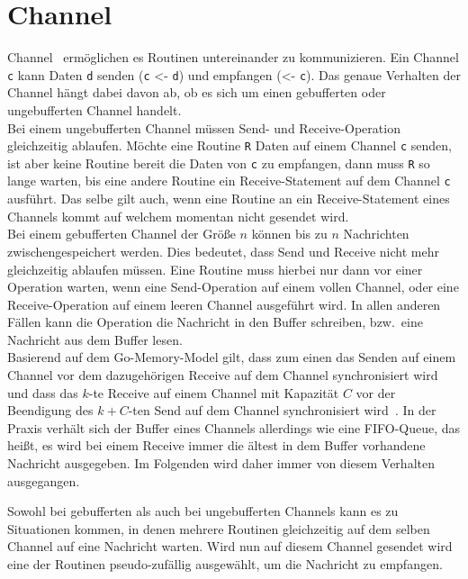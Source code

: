 \section{Channel}\label{Chap:Back-Sec:Chann}
Channel~\cite{effectiveGo} ermöglichen es Routinen untereinander zu 
kommunizieren.
Ein Channel \texttt{c} kann Daten \texttt{d} senden (\texttt{c} <- \texttt{d})
und empfangen (<- \texttt{c}). Das genaue Verhalten der Channel hängt dabei 
davon ab, ob es sich um einen gebufferten oder ungebufferten Channel handelt. \\
Bei einem ungebufferten Channel müssen Send- und Receive-Operation gleichzeitig 
ablaufen. Möchte eine Routine \texttt{R} Daten auf einem Channel \texttt{c} senden, 
ist aber keine Routine bereit die Daten von \texttt{c} zu empfangen, 
dann muss \texttt{R} so lange warten, bis eine andere Routine ein
Receive-Statement auf dem Channel \texttt{c} ausführt. Das selbe gilt auch, wenn 
eine Routine an ein Receive-Statement eines Channels kommt auf welchem 
momentan nicht gesendet wird.\\
Bei einem gebufferten Channel der Größe $n$ können bis zu $n$ Nachrichten
zwischengespeichert werden. Dies bedeutet, dass Send und Receive nicht mehr 
gleichzeitig ablaufen müssen. Eine Routine muss hierbei nur dann 
vor einer Operation warten, wenn eine Send-Operation auf einem vollen 
Channel, oder eine Receive-Operation auf einem leeren Channel ausgeführt 
wird. In allen anderen Fällen kann die Operation die Nachricht in den Buffer 
schreiben, bzw.~eine Nachricht aus dem Buffer lesen.\\
Basierend auf dem 
Go-Memory-Model gilt, dass zum einen das Senden auf einem Channel vor dem 
dazugehörigen Receive auf dem Channel synchronisiert wird und dass 
das $k$-te Receive auf einem Channel mit Kapazität $C$ vor der Beendigung
des $k+C$-ten Send auf dem Channel synchronisiert wird~\cite{memModel}.   
In der Praxis verhält sich der Buffer eines Channels allerdings wie eine FIFO-Queue,
das heißt, es wird bei einem Receive immer die ältest in dem
Buffer vorhandene Nachricht ausgegeben. Im Folgenden wird daher immer von diesem 
Verhalten ausgegangen.

Sowohl bei gebufferten als auch bei ungebufferten Channels kann es zu 
Situationen kommen, in denen mehrere Routinen gleichzeitig auf dem selben 
Channel auf eine Nachricht warten. Wird nun auf diesem Channel gesendet 
wird eine der Routinen pseudo-zufällig ausgewählt, um die Nachricht zu empfangen.

